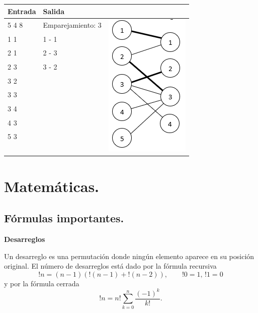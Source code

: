 \documentclass[11pt, letterpaper, twoside]{article}
\begin{document}
\begin{tabular}{|p{4cm}|p{4cm}|p{7.5cm}|}
\hline
\textbf{Entrada} & \textbf{Salida} & \\ \hline
5 4 8 & Emparejamiento: 3 & \multirow{13}{*}{\includegraphics[height = 0.24\textheight]{Grafos/Imagenes/MaxMatching.png}} \\
1 1   & 1 - 1 & \\
2 1   & 2 - 3 & \\
2 3   & 3 - 2 & \\
3 2   & & \\
3 3   & & \\
3 4   & & \\
4 3   & & \\
5 3   & & \\ 
 & & \\
 & & \\
 & & \\ 
 & & \\\hline
\end{tabular}

\newpage

\section{Matemáticas.}

\subsection{Fórmulas importantes.}

\textbf{Desarreglos}

Un desarreglo es una permutación donde ningún elemento aparece en su posición original. El número de desarreglos está dado por la fórmula recursiva 
$$!n = (n - 1)(!(n - 1) + !(n - 2)), \qquad !0 = 1, \, !1 = 0$$ 
y por la fórmula cerrada
$$!n = n! \sum_{k=0}^n \frac{(-1)^k}{k!}.$$
\end{document}
